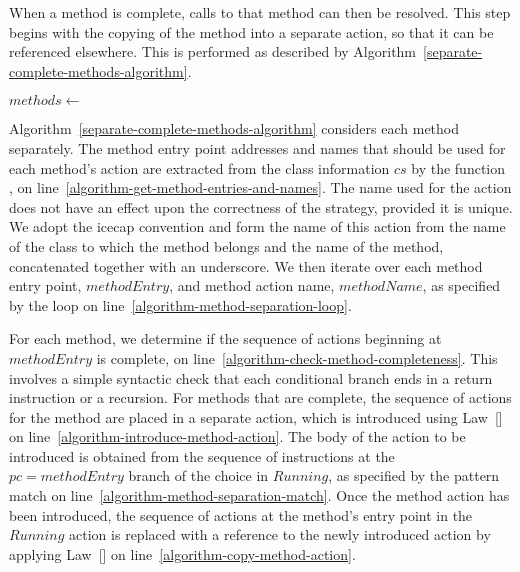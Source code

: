 When a method is complete, calls to that method can then be resolved.
This step begins with the copying of the method into a separate
action, so that it can be referenced elsewhere.
This is performed as described by
Algorithm~\ref{separate-complete-methods-algorithm}.
\begin{algorithm}
  \begin{algorithmic}[1]
    \State $methods \gets$ 
    \label{algorithm-get-method-entries-and-names}
     \label{algorithm-method-separation-loop}
     \label{algorithm-check-method-completeness}
    \label{algorithm-method-separation-match}
    \State {} \label{algorithm-introduce-method-action}
    \State {} \label{algorithm-copy-method-action}
    \EndIf
    \EndFor
  \end{algorithmic}
  \caption{}
  \label{separate-complete-methods-algorithm}
\end{algorithm}

Algorithm~\ref{separate-complete-methods-algorithm} considers each
method separately.
The method entry point addresses and names that should be used for
each method's action are extracted from the class information $cs$ by
the function , on
line~\ref{algorithm-get-method-entries-and-names}. 
The name used for the action does not have an effect upon the
correctness of the strategy, provided it is unique.
We adopt the icecap convention and form the name of this action from
the name of the class to which the method belongs and the name of the
method, concatenated together with an underscore.
We then iterate over each method entry point, $methodEntry$, and
method action name, $methodName$, as specified by the loop on
line~\ref{algorithm-method-separation-loop}.

For each method, we determine if the sequence of actions beginning at
$methodEntry$ is complete, on
line~\ref{algorithm-check-method-completeness}.
This involves a simple syntactic check that each conditional branch
ends in a return instruction or a recursion.
For methods that are complete, the sequence of actions for the method
are placed in a separate action, which is introduced using
Law~[] on
line~\ref{algorithm-introduce-method-action}.
The body of the action to be introduced is obtained from the sequence
of instructions at the $pc = methodEntry$ branch of the choice in
$Running$, as specified by the pattern match on
line~\ref{algorithm-method-separation-match}.
Once the method action has been introduced, the sequence of actions at
the method's entry point in the $Running$ action is replaced with a
reference to the newly introduced action by applying
Law~[] on
line~\ref{algorithm-copy-method-action}.

